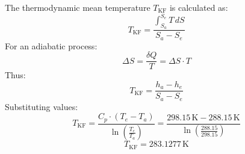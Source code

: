 The thermodynamic mean temperature \( T_{\text{KF}} \) is calculated as:  
\[
T_{\text{KF}} = \frac{\int_{S_a}^{S_e} T \, dS}{S_a - S_e}
\]  
For an adiabatic process:  
\[
\Delta S = \frac{\delta Q}{T} = \Delta S \cdot T
\]  
Thus:  
\[
T_{\text{KF}} = \frac{h_a - h_e}{S_a - S_e}
\]  
Substituting values:  
\[
T_{\text{KF}} = \frac{C_p \cdot (T_e - T_a)}{\ln \left( \frac{T_e}{T_a} \right)} = \frac{298.15 \, \text{K} - 288.15 \, \text{K}}{\ln \left( \frac{288.15}{298.15} \right)}
\]  
\[
T_{\text{KF}} = 283.1277 \, \text{K}
\]